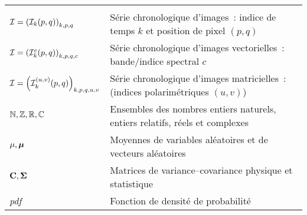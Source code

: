 \documentclass[main.tex]{subfiles}
\begin{document}

\vspace{11pt}

\NoFnRule



\enlargethispage{2.4pc}

\begin{longtable}[c]{>{\raggedright\arraybackslash}p{40mm}>{\raggedright\arraybackslash}p{78mm}}
 &\\[6pt]
$\mathcal{I}=\left(\mathcal{I}_{k}(p,q)\right)_{k,p,q}$ & S\'erie chronologique d'images~: indice de temps $k$ et position de pixel $(p,q)$\\[18pt]
$\mathcal{I}=\left(\mathcal{I}_{k}^{c}(p,q)\right)_{k,p,q,c}$ & S\'erie chronologique d'images vectorielles~: bande/indice spectral $c$\\[3pt]
$\mathcal{I}=\left(\mathcal{I}_{k}^{(u,v)}(p,q)\right)_{k,p,q,u,v}$ & S\'erie chronologique d'images matricielles~: (indices polarim\'etriques $(u,v)$)\\[6pt]
$\mathbb{N},\mathbb{Z},\mathbb{R},\mathbb{C}$ & Ensembles des nombres entiers naturels, entiers relatifs, r\'eels et complexes\\[18pt]
$\mu,\bm{\mu}$ & Moyennes de variables al\'eatoires et de vecteurs al\'eatoires\\[6pt]
$\mathbf{C},\mathbf{\Sigma}$ & Matrices de variance--covariance physique et statistique\\[6pt]
\emph{pdf} & Fonction de densit\'e de probabilit\'e\tabularnewline
\end{longtable}
\end{document}
